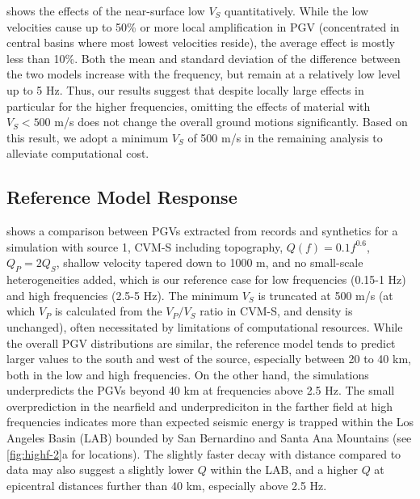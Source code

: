  shows the effects of the near-surface low $V_S$ quantitatively. While the low velocities cause up to 50\% or more local amplification in PGV (concentrated in central basins where most lowest velocities reside), the average effect is mostly less than 10\%. Both the mean and standard deviation of the difference between the two models increase with the frequency, but remain at a relatively low level up to 5 Hz. Thus, our results suggest that despite locally large effects in particular for the higher frequencies, omitting the effects of material with $V_S < 500$ m/s does not change the overall ground motions significantly. Based on this result, we adopt a minimum $V_S$ of 500 m/s in the remaining analysis to alleviate computational cost.


\subsection{Reference Model Response}
 shows a comparison between PGVs extracted from records and synthetics for a simulation with source 1, CVM-S including topography, $Q(f)=0.1f^{0.6}$, $Q_P=2Q_S$, shallow velocity tapered down to 1000 m, and no small-scale heterogeneities added, which is our reference case for low frequencies (0.15-1 Hz) and high frequencies (2.5-5 Hz). The minimum $V_S$ is truncated at 500 m/s (at which $V_P$ is calculated from the $V_P/V_S$ ratio in CVM-S, and density is unchanged), often necessitated by limitations of computational resources. While the overall PGV distributions are similar, the reference model tends to predict larger values to the south and west of the source, especially between 20 to 40 km, both in the low and high frequencies. On the other hand, the simulations underpredicts the PGVs beyond 40 km at frequencies above 2.5 Hz. The small overprediction in the nearfield and underprediciton in the farther field at high frequencies indicates more than expected seismic energy is trapped within the Los Angeles Basin (LAB) bounded by San Bernardino and Santa Ana Mountains (see \cref{fig:highf-2}a for locations). The slightly faster decay with distance compared to data may also suggest a slightly lower $Q$ within the LAB, and a higher $Q$ at epicentral distances further than 40 km, especially above 2.5 Hz.


